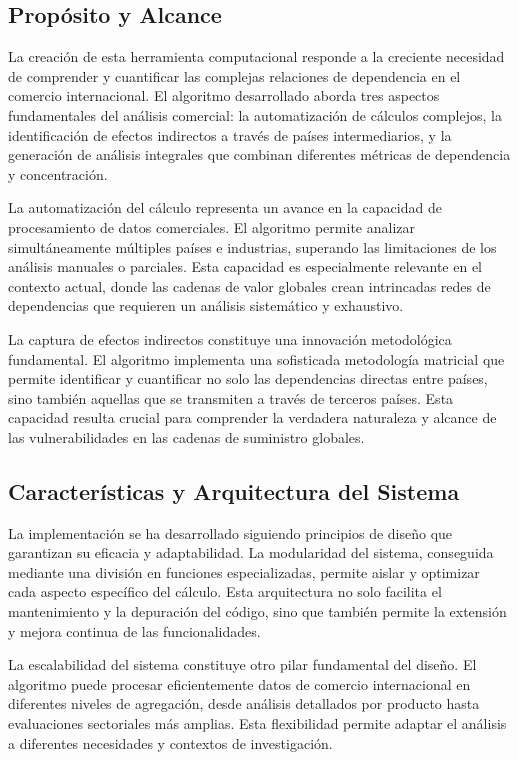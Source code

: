 \documentclass[authoryear]{elsarticle}
\begin{document}
\subsection{Propósito y Alcance}

La creación de esta herramienta computacional responde a la creciente necesidad de comprender y cuantificar las complejas relaciones de dependencia en el comercio internacional. El algoritmo desarrollado aborda tres aspectos fundamentales del análisis comercial: la automatización de cálculos complejos, la identificación de efectos indirectos a través de países intermediarios, y la generación de análisis integrales que combinan diferentes métricas de dependencia y concentración.

La automatización del cálculo representa un avance en la capacidad de procesamiento de datos comerciales. El algoritmo permite analizar simultáneamente múltiples países e industrias, superando las limitaciones de los análisis manuales o parciales. Esta capacidad es especialmente relevante en el contexto actual, donde las cadenas de valor globales crean intrincadas redes de dependencias que requieren un análisis sistemático y exhaustivo.

La captura de efectos indirectos constituye una innovación metodológica fundamental. El algoritmo implementa una sofisticada metodología matricial que permite identificar y cuantificar no solo las dependencias directas entre países, sino también aquellas que se transmiten a través de terceros países. Esta capacidad resulta crucial para comprender la verdadera naturaleza y alcance de las vulnerabilidades en las cadenas de suministro globales.

\subsection{Características y Arquitectura del Sistema}

La implementación se ha desarrollado siguiendo principios de diseño que garantizan su eficacia y adaptabilidad. La modularidad del sistema, conseguida mediante una  división en funciones especializadas, permite aislar y optimizar cada aspecto específico del cálculo. Esta arquitectura no solo facilita el mantenimiento y la depuración del código, sino que también permite la extensión y mejora continua de las funcionalidades.

La escalabilidad del sistema constituye otro pilar fundamental del diseño. El algoritmo puede procesar eficientemente datos de comercio internacional en diferentes niveles de agregación, desde análisis detallados por producto hasta evaluaciones sectoriales más amplias. Esta flexibilidad permite adaptar el análisis a diferentes necesidades y contextos de investigación.
\end{document}
